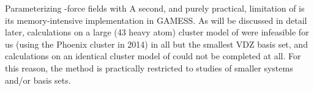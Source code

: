 \begin{section}{Parameterizing \cus-\mof force fields with \lmoeda}
A second, and purely practical, limitation of \lmoeda is its memory-intensive
implementation in GAMESS. As will be discussed in detail later,
calculations on a large (43 heavy atom) cluster model of \mgmof were
infeasible for us (using the Phoenix cluster in 2014) in all but the smallest VDZ
basis set, and calculations on an identical cluster model of \comof could not
be completed at all. For this reason, the \lmoeda method is practically
restricted to studies of smaller systems and/or basis sets.


\end{section}
